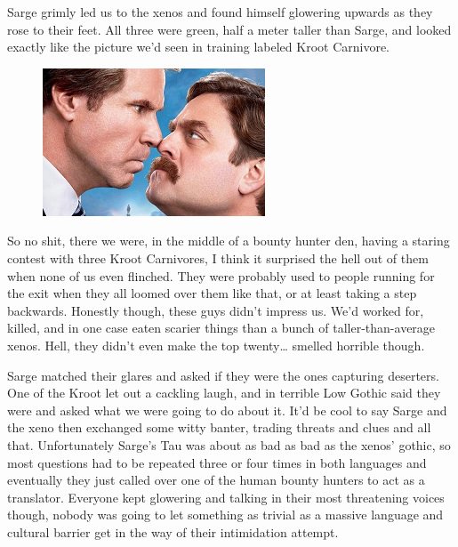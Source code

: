 Sarge grimly led us to the xenos and found himself glowering upwards as they rose to their feet. 
All three were green, half a meter taller than Sarge, and looked exactly like the picture we'd seen in training labeled Kroot Carnivore.

\begin{figure}
	\begin{center}
		\includegraphics[width=\figwidth]{pics/10/25.png}
	\end{center}
\end{figure}
So no shit, there we were, in the middle of a bounty hunter den, having a staring contest with three Kroot Carnivores, I think it surprised the hell out of them when none of us even flinched. 
They were probably used to people running for the exit when they all loomed over them like that, or at least taking a step backwards. 
Honestly though, these guys didn't impress us. 
We'd worked for, killed, and in one case eaten scarier things than a bunch of taller-than-average xenos. 
Hell, they didn't even make the top twenty… smelled horrible though.

Sarge matched their glares and asked if they were the ones capturing deserters. 
One of the Kroot let out a cackling laugh, and in terrible Low Gothic said they were and asked what we were going to do about it. 
It'd be cool to say Sarge and the xeno then exchanged some witty banter, trading threats and clues and all that. 
Unfortunately Sarge's Tau was about as bad as bad as the xenos' gothic, so most questions had to be repeated three or four times in both languages and eventually they just called over one of the human bounty hunters to act as a translator. 
Everyone kept glowering and talking in their most threatening voices though, nobody was going to let something as trivial as a massive language and cultural barrier get in the way of their intimidation attempt.

